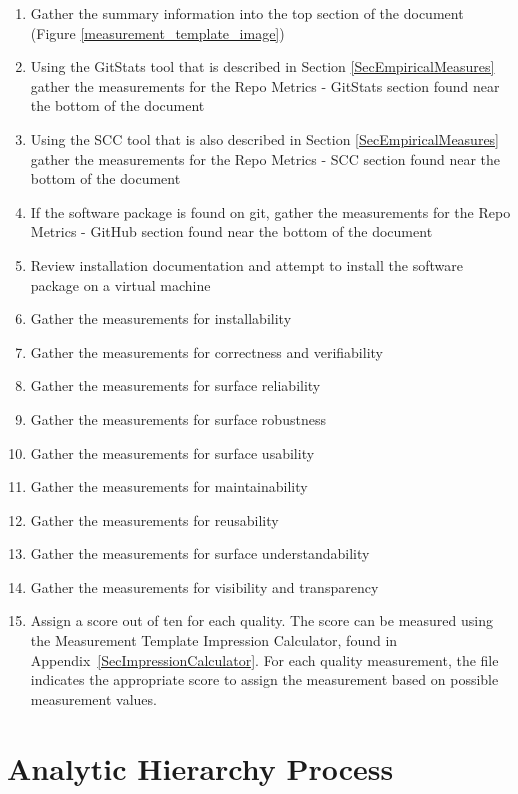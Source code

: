 \documentclass[letterpaper,cleveref]{lipics-v2019}
\begin{document}
\begin{enumerate}
\item Gather the summary information into the top section of the document
  (Figure \ref{measurement_template_image})
\item Using the GitStats tool that is described in Section
  \ref{SecEmpiricalMeasures} gather the measurements for the Repo Metrics -
  GitStats section found near the bottom of the document
\item Using the SCC tool that is also described in Section
  \ref{SecEmpiricalMeasures} gather the measurements for the Repo Metrics - SCC
  section found near the bottom of the document
\item If the software package is found on git, gather the measurements for the
  Repo Metrics - GitHub section found near the bottom of the document
\item Review installation documentation and attempt to install the software
  package on a virtual machine
\item Gather the measurements for installability
\item Gather the measurements for correctness and verifiability
\item Gather the measurements for surface reliability
\item Gather the measurements for surface robustness
\item Gather the measurements for surface usability
\item Gather the measurements for maintainability
\item Gather the measurements for reusability
\item Gather the measurements for surface understandability
\item Gather the measurements for visibility and transparency
\item Assign a score out of ten for each quality. The score can be measured
  using the Measurement Template Impression Calculator, found in
  Appendix~\ref{SecImpressionCalculator}. For each quality measurement, the file
  indicates the appropriate score to assign the measurement based on possible
  measurement values.
\end{enumerate}

\section{Analytic Hierarchy Process} \label{SecAHP}
\end{document}

